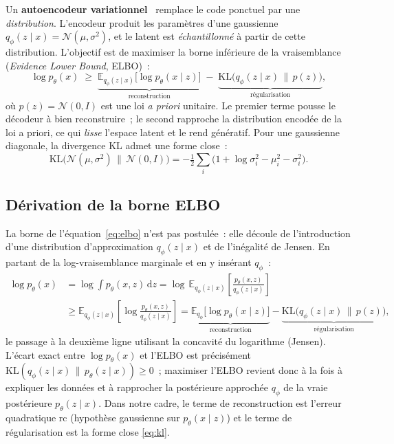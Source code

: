 \documentclass[12pt,a4paper,oneside]{report}
\theoremstyle{definition}
\theoremstyle{plain}
\newcommand{\rc}{\mathrm{rc}}
\newcommand{\E}{\mathbb{E}}
\newcommand{\KL}{\mathrm{KL}}
\newcommand{\Ncal}{\mathcal{N}}
\begin{document}
Un \textbf{autoencodeur variationnel}~\cite{kingma2014vae} remplace le code
ponctuel par une \emph{distribution}. L'encodeur produit les paramètres d'une
gaussienne $q_\phi(z\mid x) = \Ncal(\mu, \sigma^2)$, et le latent est
\emph{échantillonné} à partir de cette distribution. L'objectif est de maximiser
la borne inférieure de la vraisemblance (\emph{Evidence Lower Bound}, ELBO)~:
\begin{equation}
\log p_\theta(x)\;\ge\;\underbrace{\E_{q_\phi(z\mid x)}\big[\log p_\theta(x\mid z)\big]}_{\text{reconstruction}}
\;-\;\underbrace{\KL\!\big(q_\phi(z\mid x)\,\|\,p(z)\big)}_{\text{régularisation}} ,
\label{eq:elbo}
\end{equation}
où $p(z) = \Ncal(0, I)$ est une loi \emph{a priori} unitaire. Le premier terme
pousse le décodeur à bien reconstruire~; le second rapproche la distribution
encodée de la loi a priori, ce qui \emph{lisse} l'espace latent et le rend
génératif. Pour une gaussienne diagonale, la divergence KL admet une forme
close~:
\begin{equation}
\KL\!\big(\Ncal(\mu,\sigma^2)\,\|\,\Ncal(0,I)\big)
= -\tfrac{1}{2}\sum_{i}\big(1 + \log\sigma_i^2 - \mu_i^2 - \sigma_i^2\big).
\label{eq:kl}
\end{equation}

\subsection{Dérivation de la borne ELBO}

La borne de l'équation~\eqref{eq:elbo} n'est pas postulée~: elle découle de
l'introduction d'une distribution d'approximation $q_\phi(z\mid x)$ et de
l'inégalité de Jensen. En partant de la log-vraisemblance marginale et en y
insérant $q_\phi$~:
\begin{align}
\log p_\theta(x)
&= \log\!\int p_\theta(x,z)\,\mathrm{d}z
 = \log\,\E_{q_\phi(z\mid x)}\!\left[\frac{p_\theta(x,z)}{q_\phi(z\mid x)}\right]\\
&\ge \E_{q_\phi(z\mid x)}\!\left[\log\frac{p_\theta(x,z)}{q_\phi(z\mid x)}\right]
 = \underbrace{\E_{q_\phi}\big[\log p_\theta(x\mid z)\big]}_{\text{reconstruction}}
 - \underbrace{\KL\!\big(q_\phi(z\mid x)\,\|\,p(z)\big)}_{\text{régularisation}},
\end{align}
le passage à la deuxième ligne utilisant la concavité du logarithme (Jensen).
L'écart exact entre $\log p_\theta(x)$ et l'ELBO est précisément
$\KL(q_\phi(z\mid x)\,\|\,p_\theta(z\mid x))\ge0$~; maximiser l'ELBO revient donc à
la fois à expliquer les données et à rapprocher la postérieure approchée
$q_\phi$ de la vraie postérieure $p_\theta(z\mid x)$. Dans notre cadre, le terme de
reconstruction est l'erreur quadratique $\rc$ (hypothèse gaussienne sur
$p_\theta(x\mid z)$) et le terme de régularisation est la forme close
\eqref{eq:kl}.
\end{document}
